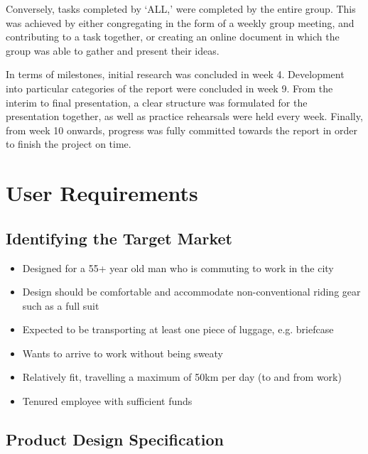 \documentclass[a4paper,11pt]{article}
\begin{document}
Conversely, tasks completed by `ALL,' were completed by the entire group. This was achieved by either congregating in the form of a weekly group meeting, and contributing to a task together, or creating an online document in which the group was able to gather and present their ideas.

In terms of milestones, initial research was concluded in week 4. Development into particular categories of the report were concluded in week 9. From the interim to final presentation, a clear structure was formulated for the presentation together, as well as practice rehearsals were held every week. Finally, from week 10 onwards, progress was fully committed towards the report in order to finish the project on time.

\section{User Requirements}

\subsection{Identifying the Target Market}

\begin{itemize}
	\setlength{\itemsep}{0pt}
	\item Designed for a 55+ year old man who is commuting to work in the city
	\item Design should be comfortable and accommodate non-conventional riding gear such as a full suit
	\item Expected to be transporting at least one piece of luggage, e.g. briefcase
	\item Wants to arrive to work without being sweaty
	\item Relatively fit, travelling a maximum of 50km per day (to and from work)
	\item Tenured employee with sufficient funds
\end{itemize}

\subsection{Product Design Specification}
\label{sec:pds}
\end{document}

